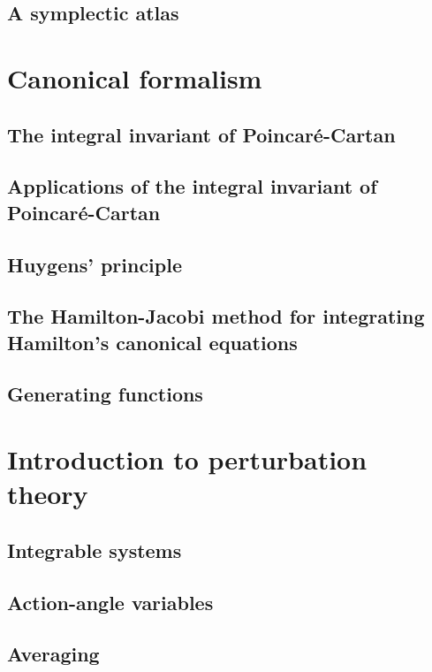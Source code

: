 \documentclass{book}
\numberwithin{equation}{section}
\theoremstyle{plain}
\theoremstyle{definition}
\theoremstyle{remark}
\theoremstyle{remark}
\begin{document}
\section{A symplectic atlas}

\chapter{Canonical formalism}

\section{The integral invariant of Poincar\'e-Cartan}

\section{Applications of the integral invariant of Poincar\'e-Cartan}

\section{Huygens' principle}

\section{The Hamilton-Jacobi method for integrating Hamilton's canonical equations}

\section{Generating functions}

\chapter{Introduction to perturbation theory}

\section{Integrable systems}

\section{Action-angle variables}

\section{Averaging}
\end{document}
